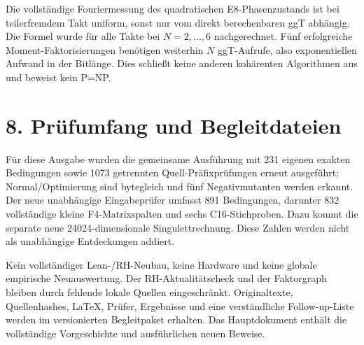 \documentclass[11pt,a4paper,oneside,parskip=half,headings=normal]{scrreprt}
\begin{document}
Die vollständige Fouriermessung des quadratischen E8-Phasenzustands ist bei teilerfremdem Takt uniform, sonst nur vom direkt berechenbaren ggT abhängig. Die Formel wurde für alle Takte bei $N=2,\ldots,6$ nachgerechnet. Fünf erfolgreiche Moment-Faktorisierungen benötigen weiterhin $N$ ggT-Aufrufe, also exponentiellen Aufwand in der Bitlänge. Dies schließt keine anderen kohärenten Algorithmen aus und beweist kein P=NP.

\section*{8. Prüfumfang und Begleitdateien}
Für diese Ausgabe wurden die gemeinsame Ausführung mit 231 eigenen exakten Bedingungen sowie 1073 getrennten Quell-Präfixprüfungen erneut ausgeführt; Normal/Optimierung sind bytegleich und fünf Negativmutanten werden erkannt. Der neue unabhängige Eingabeprüfer umfasst 891 Bedingungen, darunter 832 vollständige kleine F4-Matrixspalten und sechs C16-Stichproben. Dazu kommt die separate neue 24024-dimensionale Singulettrechnung. Diese Zahlen werden nicht als unabhängige Entdeckungen addiert.

Kein vollständiger Lean-/RH-Neubau, keine Hardware und keine globale empirische Neuauswertung. Der RH-Aktualitätscheck und der Faktorgraph bleiben durch fehlende lokale Quellen eingeschränkt. Originaltexte, Quellenhashes, LaTeX, Prüfer, Ergebnisse und eine verständliche Follow-up-Liste werden im versionierten Begleitpaket erhalten. Das Hauptdokument enthält die vollständige Vorgeschichte und ausführlichen neuen Beweise.
\end{document}
